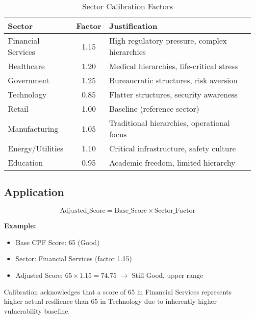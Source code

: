 \documentclass[11pt,a4paper]{article}
\begin{document}
\begin{table}[h]
\centering
\caption{Sector Calibration Factors}
\begin{tabular}{lcp{5cm}}
\toprule
\textbf{Sector} & \textbf{Factor} & \textbf{Justification} \\
\midrule
Financial Services & 1.15 & High regulatory pressure, complex hierarchies \\
Healthcare & 1.20 & Medical hierarchies, life-critical stress \\
Government & 1.25 & Bureaucratic structures, risk aversion \\
Technology & 0.85 & Flatter structures, security awareness \\
Retail & 1.00 & Baseline (reference sector) \\
Manufacturing & 1.05 & Traditional hierarchies, operational focus \\
Energy/Utilities & 1.10 & Critical infrastructure, safety culture \\
Education & 0.95 & Academic freedom, limited hierarchy \\
\bottomrule
\end{tabular}
\end{table}

\subsection{Application}

\begin{equation}
\text{Adjusted\_Score} = \text{Base\_Score} \times \text{Sector\_Factor}
\end{equation}

\textbf{Example:}
\begin{itemize}
\item Base CPF Score: 65 (Good)
\item Sector: Financial Services (factor 1.15)
\item Adjusted Score: $65 \times 1.15 = 74.75$ $\rightarrow$ Still Good, upper range
\end{itemize}

Calibration acknowledges that a score of 65 in Financial Services represents higher actual resilience than 65 in Technology due to inherently higher vulnerability baseline.


\newpage
\end{document}
